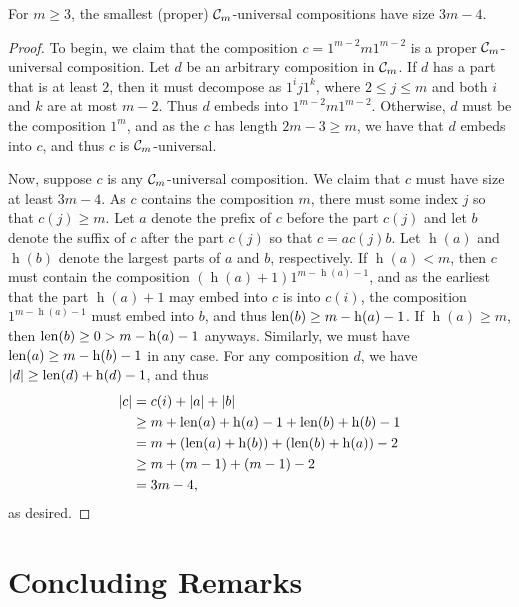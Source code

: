 \begin{theorem}
	For $m \ge 3$, the smallest (proper) $\mathcal{C}_m$-universal compositions have size $3m-4$.
\end{theorem}
\begin{proof}
	To begin, we claim that the composition $c = 1^{m-2} m 1^{m-2}$ is a proper $\mathcal{C}_m$-universal composition. Let $d$ be an arbitrary composition in $\mathcal{C}_m$. If $d$ has a part that is at least $2$, then it must decompose as $1^i j 1^k$, where $2 \le j \le m$ and both $i$ and $k$ are at most $m-2$. Thus $d$ embeds into $1^{m-2} m 1^{m-2}$. Otherwise, $d$ must be the composition $1^m$, and as the $c$ has length $2m-3 \ge m$, we have that $d$ embeds into $c$, and thus $c$ is $\mathcal{C}_m$-universal.

	Now, suppose $c$ is any $\mathcal{C}_m$-universal composition. We claim that $c$ must have size at least $3m-4$. As $c$ contains the composition $m$, there must some index $j$ so that $c(j) \ge m$. Let $a$ denote the prefix of $c$ before the part $c(j)$ and let $b$ denote the suffix of $c$ after the part $c(j)$ so that $c = a c(j) b$. Let $\operatorname{h}(a)$ and $\operatorname{h}(b)$ denote the largest parts of $a$ and $b$, respectively. If $\operatorname{h}(a) < m$, then $c$ must contain the composition $(\operatorname{h}(a)+1)1^{m-\operatorname{h}(a)-1}$, and as the earliest that the part $\operatorname{h}(a)+1$ may embed into $c$ is into $c(i)$, the composition $1^{m-\operatorname{h}(a)-1}$ must embed into $b$, and thus $\operatorname{len}(b) \ge m-\operatorname{h}(a)-1$. If $\operatorname{h}(a) \ge m$, then $\operatorname{len}(b) \ge 0 > m - \operatorname{h}(a) - 1$ anyways. Similarly, we must have $\operatorname{len}(a) \ge m - \operatorname{h}(b) - 1$ in any case. For any composition $d$, we have $\left\lvert{d}\right\rvert \ge \operatorname{len}(d) + \operatorname{h}(d) - 1$, and thus
	\begin{align*}
		\left\lvert{c}\right\rvert
			&= c(i) + \left\lvert{a}\right\rvert + \left\lvert{b}\right\rvert \\
			&\ge m +  \operatorname{len}(a) + \operatorname{h}(a) - 1 + \operatorname{len}(b) + \operatorname{h}(b)  - 1 \\
			&=   m + (\operatorname{len}(a) + \operatorname{h}(b)) +   (\operatorname{len}(b) + \operatorname{h}(a)) - 2 \\
			&\ge m + (m-1) + (m-1) - 2 \\
			&= 3m-4,
	\end{align*}
	as desired.
\end{proof}

\section{Concluding Remarks}
\label{sec-comp-conclusion}

